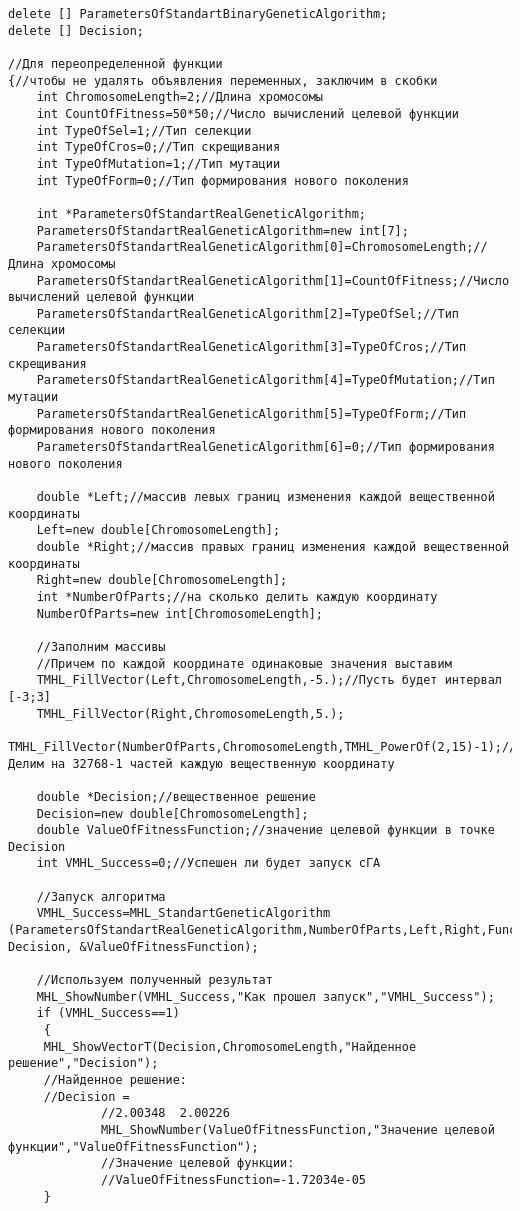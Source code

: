 \documentclass[a4paper,12pt]{article}
\begin{document}
\begin{lstlisting}[label=code_use_MHL_StandartGeneticAlgorithm,caption=Пример использования]
delete [] ParametersOfStandartBinaryGeneticAlgorithm;
delete [] Decision;

//Для переопределенной функции
{//чтобы не удалять объявления переменных, заключим в скобки
    int ChromosomeLength=2;//Длина хромосомы
    int CountOfFitness=50*50;//Число вычислений целевой функции
    int TypeOfSel=1;//Тип селекции
    int TypeOfCros=0;//Тип скрещивания
    int TypeOfMutation=1;//Тип мутации
    int TypeOfForm=0;//Тип формирования нового поколения

    int *ParametersOfStandartRealGeneticAlgorithm;
    ParametersOfStandartRealGeneticAlgorithm=new int[7];
    ParametersOfStandartRealGeneticAlgorithm[0]=ChromosomeLength;//Длина хромосомы
    ParametersOfStandartRealGeneticAlgorithm[1]=CountOfFitness;//Число вычислений целевой функции
    ParametersOfStandartRealGeneticAlgorithm[2]=TypeOfSel;//Тип селекции
    ParametersOfStandartRealGeneticAlgorithm[3]=TypeOfCros;//Тип скрещивания
    ParametersOfStandartRealGeneticAlgorithm[4]=TypeOfMutation;//Тип мутации
    ParametersOfStandartRealGeneticAlgorithm[5]=TypeOfForm;//Тип формирования нового поколения
    ParametersOfStandartRealGeneticAlgorithm[6]=0;//Тип формирования нового поколения

    double *Left;//массив левых границ изменения каждой вещественной координаты
    Left=new double[ChromosomeLength];
    double *Right;//массив правых границ изменения каждой вещественной координаты
    Right=new double[ChromosomeLength];
    int *NumberOfParts;//на сколько делить каждую координату
    NumberOfParts=new int[ChromosomeLength];

    //Заполним массивы
    //Причем по каждой координате одинаковые значения выставим
    TMHL_FillVector(Left,ChromosomeLength,-5.);//Пусть будет интервал [-3;3]
    TMHL_FillVector(Right,ChromosomeLength,5.);
    TMHL_FillVector(NumberOfParts,ChromosomeLength,TMHL_PowerOf(2,15)-1);//Делим на 32768-1 частей каждую вещественную координату

    double *Decision;//вещественное решение
    Decision=new double[ChromosomeLength];
    double ValueOfFitnessFunction;//значение целевой функции в точке Decision
    int VMHL_Success=0;//Успешен ли будет запуск cГА

    //Запуск алгоритма
    VMHL_Success=MHL_StandartGeneticAlgorithm (ParametersOfStandartRealGeneticAlgorithm,NumberOfParts,Left,Right,Func2, Decision, &ValueOfFitnessFunction);

    //Используем полученный результат
    MHL_ShowNumber(VMHL_Success,"Как прошел запуск","VMHL_Success");
    if (VMHL_Success==1)
     {
     MHL_ShowVectorT(Decision,ChromosomeLength,"Найденное решение","Decision");
     //Найденное решение:
     //Decision =	
			 //2.00348	2.00226
			 MHL_ShowNumber(ValueOfFitnessFunction,"Значение целевой функции","ValueOfFitnessFunction");
			 //Значение целевой функции:
			 //ValueOfFitnessFunction=-1.72034e-05
     }


\end{lstlisting}
\end{document}
